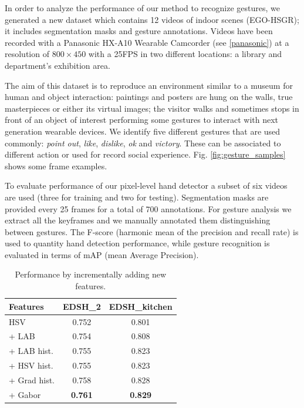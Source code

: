In order to analyze the performance of our method to recognize gestures, we generated a new dataset which contains 12 videos of indoor scenes (EGO-HSGR); it includes segmentation masks and gesture annotations. Videos have been recorded with a Panasonic HX-A10 Wearable Camcorder (see \ref{panasonic}) at a resolution of $800 \times 450$ with a 25FPS in two different locations: a library and department's exhibition area.   

The aim of this dataset is to reproduce an environment similar to a museum for human and object interaction: paintings and posters are hung on the walls, true masterpieces or either its virtual images; the visitor walks and sometimes stops in front of an object of interest performing some gestures to interact with next generation wearable devices. We identify five different gestures that are used commonly: \textit{point out}, \textit{like}, \textit{dislike}, \textit{ok} and \textit{victory}. These can be associated to different action or used for record social experience. Fig. \ref{fig:gesture_samples} shows some frame examples. 

To evaluate performance of our pixel-level hand detector a subset of six videos are used (three for training and two for testing). Segmentation masks are provided every 25 frames for a total of 700 annotations. For gesture analysis we extract all the keyframes and we manually annotated them distinguishing between gestures.  
The F-score (harmonic mean of the precision and recall rate) is used to quantity hand detection performance, while gesture recognition is evaluated in terms of mAP (mean Average Precision).
    
 \begin{table}
 \centering
 \begin{tabular}{|l|c|c|}
 \hline
 \textbf{Features} 	& \textbf{EDSH\_2} & \textbf{EDSH\_{kitchen}}	\\ \hline\hline
 HSV	& 0.752 & 0.801		\\ \hline
 + LAB	& 0.754	&	0.808 \\ \hline
 + LAB hist.	& 0.755 & 0.823			\\ \hline  
 + HSV hist. & 0.755 & 0.823			\\ \hline  
 + Grad hist. & 0.758	&	0.828	\\ \hline  
 + Gabor & 	\textbf{0.761}	& \textbf{0.829} \\ \hline  
 \end{tabular}
 \caption{Performance by incrementally adding new features.}\label{tab:localfeatures}
 \end{table}

